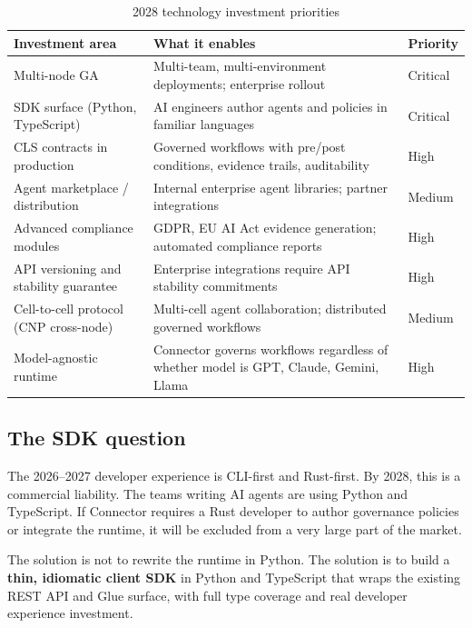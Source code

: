 \begin{table}[H]
\centering
\renewcommand{\arraystretch}{1.45}
\begin{tabularx}{\textwidth}{@{}lXl@{}}
\toprule
\textbf{Investment area} & \textbf{What it enables} & \textbf{Priority} \\
\midrule
Multi-node GA & Multi-team, multi-environment deployments; enterprise rollout & Critical \\
SDK surface (Python, TypeScript) & AI engineers author agents and policies in familiar languages & Critical \\
CLS contracts in production & Governed workflows with pre/post conditions, evidence trails, auditability & High \\
Agent marketplace / distribution & Internal enterprise agent libraries; partner integrations & Medium \\
Advanced compliance modules & GDPR, EU AI Act evidence generation; automated compliance reports & High \\
API versioning and stability guarantee & Enterprise integrations require API stability commitments & High \\
Cell-to-cell protocol (CNP cross-node) & Multi-cell agent collaboration; distributed governed workflows & Medium \\
Model-agnostic runtime & Connector governs workflows regardless of whether model is GPT, Claude, Gemini, Llama & High \\
\bottomrule
\end{tabularx}
\caption{2028 technology investment priorities}
\end{table}

\subsection{The SDK question}

The 2026--2027 developer experience is CLI-first and Rust-first. By 2028, this
is a commercial liability. The teams writing AI agents are using Python and
TypeScript. If Connector requires a Rust developer to author governance policies
or integrate the runtime, it will be excluded from a very large part of the
market.

The solution is not to rewrite the runtime in Python. The solution is to build
a \textbf{thin, idiomatic client SDK} in Python and TypeScript that wraps the
existing REST API and Glue surface, with full type coverage and real developer
experience investment.

